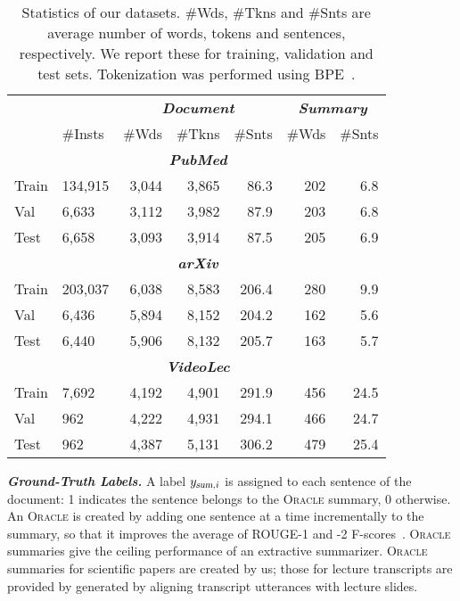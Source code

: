 \documentclass[11pt]{article}
\begin{document}
\begin{table}[t]
\setlength{\tabcolsep}{4pt}
\renewcommand{\arraystretch}{1.1}
\centering
\begin{footnotesize} 
\begin{tabular}{|ll|rrr|rr|}
\hline
\multicolumn{2}{|c|}{} & \multicolumn{3}{c|}{\textbf{\textsl{Document}}} & \multicolumn{2}{c|}{\textbf{\textsl{Summary}}} \\
 & \#Insts & \#Wds & \#Tkns & \#Snts& \#Wds & \#Snts \\
\hline
\hline
\rowcolor{gray!10}
& & \multicolumn{3}{c|}{\textsl{\textbf{PubMed}}} & & \\
Train & 134,915 & 3,044 & 3,865 & 86.3 & 202 & 6.8 \\
Val & 6,633 & 3,112 & 3,982 & 87.9 & 203 & 6.8 \\
Test & 6,658 & 3,093 & 3,914 & 87.5 & 205 & 6.9 \\
\hline
\hline
\rowcolor{gray!10}
& & \multicolumn{3}{c|}{\textsl{\textbf{arXiv}}} & & \\
Train & 203,037 & 6,038 & 8,583 & 206.4 & 280 & 9.9 \\
Val & 6,436 & 5,894 & 8,152 & 204.2 & 162 & 5.6 \\
Test & 6,440 & 5,906 & 8,132 & 205.7 & 163 & 5.7 \\
\hline
\hline
\rowcolor{gray!10}
& & \multicolumn{3}{c|}{\textsl{\textbf{VideoLec}}} & & \\
Train & 7,692 & 4,192 & 4,901 & 291.9 & 456 & 24.5 \\
Val & 962 & 4,222 & 4,931 & 294.1 & 466 & 24.7 \\
Test & 962 & 4,387 & 5,131 & 306.2 & 479 & 25.4 \\
\hline
\end{tabular}
\end{footnotesize}
\caption{Statistics of our datasets.
\#Wds, \#Tkns and \#Snts are average number of words, tokens and sentences, respectively.
We report these for training, validation and test sets.
Tokenization was performed using BPE~\cite{sennrich-etal-2016-neural}.}
\label{tab:dataset_stat}
\end{table}




\vspace{0.04in}
\noindent\textbf{\textsl{Ground-Truth Labels.}}\quad
A label $y_{\textsl{sum},i}$ is assigned to each sentence of the document:
1 indicates the sentence belongs to the \textsc{Oracle} summary, 0 otherwise.
An \textsc{Oracle} is created by adding one sentence at a time incrementally to the summary, so that it improves the average of ROUGE-1 and -2 F-scores~\cite{kedzie-etal-2018-content}.
\textsc{Oracle} summaries give the ceiling performance of an extractive summarizer. 
\textsc{Oracle} summaries for scientific papers are created by us; those for lecture transcripts are provided by \citet{lv2021vt} generated by aligning transcript utterances with lecture slides. 
\end{document}
